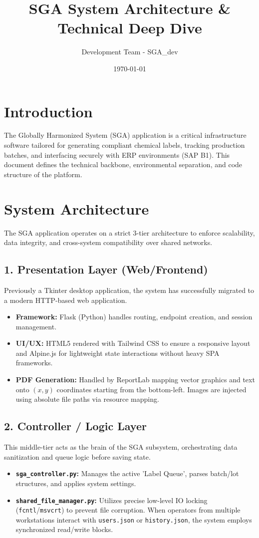 \documentclass[12pt, a4paper]{article}
\title{\textbf{SGA System Architecture \& Technical Deep Dive}}
\author{Development Team - SGA\_dev}
\date{\today}
\begin{document}
\maketitle
\tableofcontents
\newpage

\section{Introduction}
The Globally Harmonized System (SGA) application is a critical infrastructure software tailored for generating compliant chemical labels, tracking production batches, and interfacing securely with ERP environments (SAP B1). This document defines the technical backbone, environmental separation, and code structure of the platform.

\section{System Architecture}
The SGA application operates on a strict 3-tier architecture to enforce scalability, data integrity, and cross-system compatibility over shared networks.

\subsection{1. Presentation Layer (Web/Frontend)}
Previously a Tkinter desktop application, the system has successfully migrated to a modern HTTP-based web application.
\begin{itemize}
    \item \textbf{Framework:} Flask (Python) handles routing, endpoint creation, and session management.
    \item \textbf{UI/UX:} HTML5 rendered with Tailwind CSS to ensure a responsive layout and Alpine.js for lightweight state interactions without heavy SPA frameworks.
    \item \textbf{PDF Generation:} Handled by ReportLab mapping vector graphics and text onto $(x,y)$ coordinates starting from the bottom-left. Images are injected using absolute file paths via resource mapping.
\end{itemize}

\subsection{2. Controller / Logic Layer}
This middle-tier acts as the brain of the SGA subsystem, orchestrating data sanitization and queue logic before saving state.
\begin{itemize}
    \item \textbf{\texttt{sga\_controller.py}:} Manages the active 'Label Queue', parses batch/lot structures, and applies system settings.
    \item \textbf{\texttt{shared\_file\_manager.py}:} Utilizes precise low-level IO locking (\texttt{fcntl}/\texttt{msvcrt}) to prevent file corruption. When operators from multiple workstations interact with \texttt{users.json} or \texttt{history.json}, the system employs synchronized read/write blocks.
\end{itemize}
\end{document}
